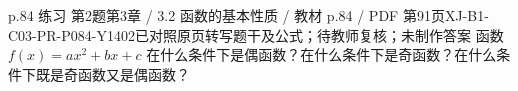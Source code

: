 \par\noindent\begin{minipage}{\linewidth}
\begin{bankitem}{p.84 练习 第2题}{第3章 / 3.2 函数的基本性质 / 教材 p.84 / PDF 第91页}{XJ-B1-C03-PR-P084-Y1402}{已对照原页转写题干及公式；待教师复核；未制作答案}
函数 $f(x)=ax^2+bx+c$ 在什么条件下是偶函数？在什么条件下是奇函数？在什么条件下既是奇函数又是偶函数？
\end{bankitem}
\end{minipage}\par\medskip
